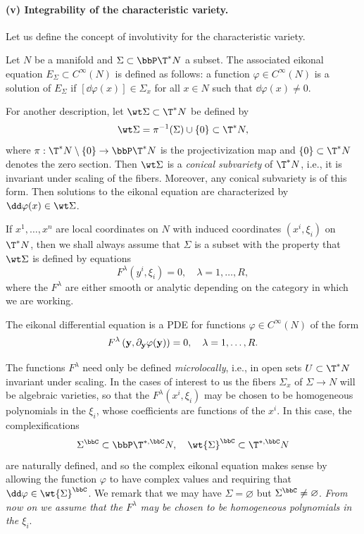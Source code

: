 \paragraph{(v) Integrability of the characteristic variety.} Let us define the concept of involutivity for the characteristic variety.

\begin{defn}
    Let $N$ be a manifold and $\Sigma\subset \bbP \T^\ast N$ a subset. The associated eikonal equation $E_\Sigma\subset C^\infty(N)$ is defined as follows: a function $\varphi\in C^\infty(N)$ is a solution of $E_\Sigma$ if $[\dd \varphi(x)]\in \Sigma_x$ for all $x\in N$ such that $\dd \varphi(x)\neq 0$.
\end{defn}

For another description, let $\wt\Sigma\subset\T^\ast N$ be defined by 
\[\wt\Sigma=\pi^{-1}(\Sigma)\cup \{0\}\subset \T^\ast N,\]
where $\pi:\T^\ast N\setminus \{0\}\to \bbP \T^\ast N$ is the projectivization map and $\{0\}\subset \T^\ast N$ denotes the zero section. Then $\wt\Sigma$ is a \emph{conical subvariety} of $\T^\ast N$, i.e., it is invariant under scaling of the fibers. Moreover, any conical subvariety is of this form. Then solutions to the eikonal equation are characterized by $\dd\varphi(x)\in \wt\Sigma$. 

If $x^1,\ldots,x^n$ are local coordinates on $N$ with induced coordinates $(x^i,\xi_i)$ on $\T^\ast N$, then we shall always assume that $\Sigma$ is a subset with the property that $\wt\Sigma$ is defined by equations 
\[F^\lambda(y^i,\xi_i)=0,\quad \lambda=1,\ldots,R,\]
where the $F^\lambda$ are either smooth or analytic depending on the category in which we are working.

\begin{defn}
    The eikonal differential equation is a PDE for functions $\varphi\in C^\infty(N)$ of the form
    \[F^\lambda\left(\bf{y},\partial_{\bf{y}}\varphi(\bf{y})\right)=0,\quad \lambda=1,\ldots,R.\]
\end{defn}

\begin{rem}
    The functions $F^\lambda$ need only be defined \emph{microlocally}, i.e., in open sets $U\subset \T^\ast N$ invariant under scaling. In the cases of interest to us the fibers $\Sigma_x$ of $\Sigma\to N$ will be algebraic varieties, so that the $F^\lambda(x^i,\xi_i)$ may be chosen to be homogeneous polynomials in the $\xi_i$, whose coefficients are functions of the $x^i$. In this case, the complexifications 
    \[\Sigma^\bbC\subset \bbP \T^{\ast,\bbC}N,\quad \wt{\Sigma}^\bbC\subset \T^{\ast,\bbC}N\]
    are naturally defined, and so the complex eikonal equation makes sense by allowing the function $\varphi$ to have complex values and requiring that $\dd\varphi\in\wt{\Sigma}^\bbC$. We remark that we may have $\Sigma=\varnothing$ but $\Sigma^\bbC\neq\varnothing$. \emph{From now on we assume that the $F^\lambda$ may be chosen to be homogeneous polynomials in the $\xi_i$}.
\end{rem}

